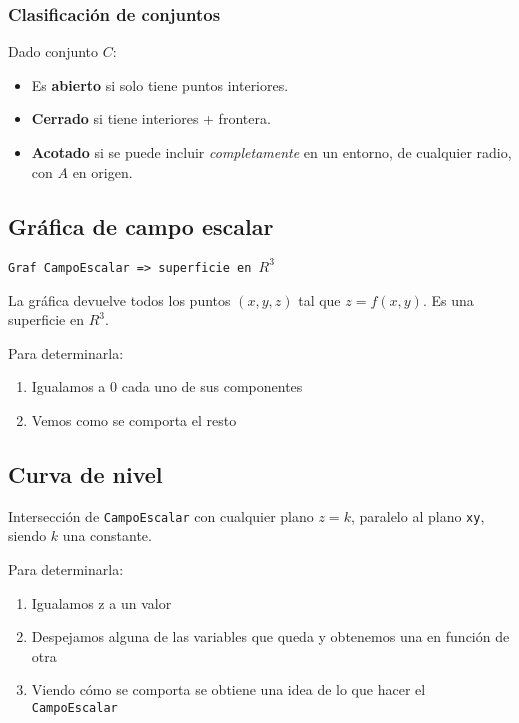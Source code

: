 \subsubsection{Clasificación de conjuntos}

Dado conjunto \(C\):

\begin{itemize}
    \item Es \textbf{abierto} si solo tiene puntos interiores.
    \item \textbf{Cerrado} si tiene interiores + frontera.
    \item \textbf{Acotado} si se puede incluir \textit{completamente} en un entorno, de cualquier radio,
    con \(A\) en origen.
\end{itemize}

\subsection{Gráfica de campo escalar}

\texttt{Graf CampoEscalar => superficie en \(R^{3}\)}

La gráfica devuelve todos los puntos \((x,y,z)\) tal que \(z = f(x,y)\).
Es una superficie en \(R^{3}\).

Para determinarla:

\begin{enumerate}
    \item Igualamos a 0 cada uno de sus componentes
    \item Vemos como se comporta el resto
\end{enumerate}

\subsection{Curva de nivel}

Intersección de \texttt{CampoEscalar} con cualquier plano \(z = k\),
paralelo al plano \texttt{xy}, siendo \(k\) una constante.

Para determinarla:

\begin{enumerate}
    \item Igualamos z a un valor
    \item Despejamos alguna de las variables que queda y obtenemos una en función de otra
    \item Viendo cómo se comporta se obtiene una idea de lo que hacer el \texttt{CampoEscalar}
\end{enumerate}

